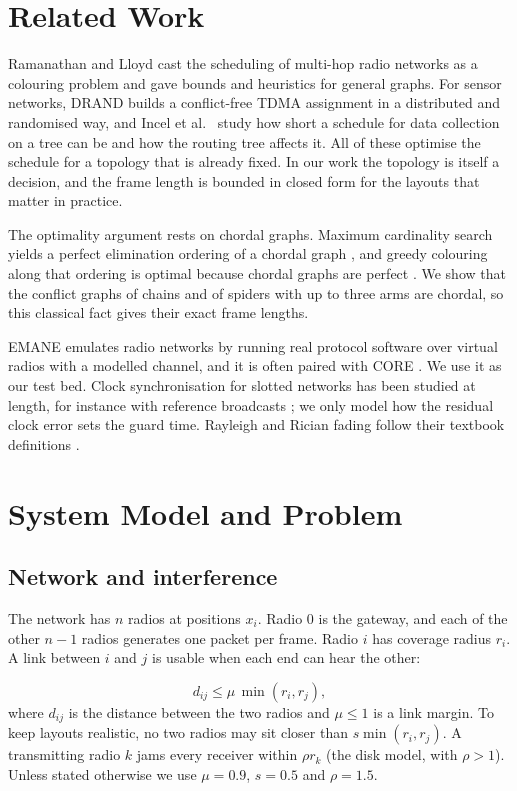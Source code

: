 \documentclass[conference]{IEEEtran}
\begin{document}
\section{Related Work}\label{sec:related}
Ramanathan and Lloyd \cite{ramanathan1993} cast the scheduling of multi-hop radio networks as a colouring problem and gave bounds and heuristics for general graphs. For sensor networks, DRAND \cite{rhee2009} builds a conflict-free TDMA assignment in a distributed and randomised way, and Incel et al.\ \cite{incel2012} study how short a schedule for data collection on a tree can be and how the routing tree affects it. All of these optimise the schedule for a topology that is already fixed. In our work the topology is itself a decision, and the frame length is bounded in closed form for the layouts that matter in practice.

The optimality argument rests on chordal graphs. Maximum cardinality search yields a perfect elimination ordering of a chordal graph \cite{tarjan1984}, and greedy colouring along that ordering is optimal because chordal graphs are perfect \cite{golumbic1980}. We show that the conflict graphs of chains and of spiders with up to three arms are chordal, so this classical fact gives their exact frame lengths.

EMANE emulates radio networks by running real protocol software over virtual radios with a modelled channel, and it is often paired with CORE \cite{ahrenholz2011}. We use it as our test bed. Clock synchronisation for slotted networks has been studied at length, for instance with reference broadcasts \cite{elson2002}; we only model how the residual clock error sets the guard time. Rayleigh and Rician fading follow their textbook definitions \cite{rappaport2002}.

\section{System Model and Problem}\label{sec:model}
\subsection{Network and interference}
The network has $n$ radios at positions $x_i$. Radio $0$ is the gateway, and each of the other $n-1$ radios generates one packet per frame. Radio $i$ has coverage radius $r_i$. A link between $i$ and $j$ is usable when each end can hear the other:

\begin{equation}
d_{ij}\le \mu\,\min(r_i,r_j),
\label{eq:link}
\end{equation}
where $d_{ij}$ is the distance between the two radios and $\mu\le 1$ is a link margin. To keep layouts realistic, no two radios may sit closer than $s\min(r_i,r_j)$. A transmitting radio $k$ jams every receiver within $\rho r_k$ (the disk model, with $\rho>1$). Unless stated otherwise we use $\mu=0.9$, $s=0.5$ and $\rho=1.5$.
\end{document}
